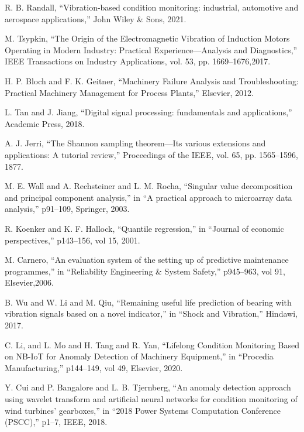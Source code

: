 \documentclass[conference]{IEEEtran}
\begin{document}
\begin{thebibliography}{00}
	 R. B. Randall, ``Vibration-based condition monitoring: industrial, automotive and aerospace applications,'' John Wiley \& Sons, 2021.

     M. Tsypkin, ``The Origin of the Electromagnetic Vibration of Induction Motors Operating in Modern Industry: Practical Experience—Analysis and Diagnostics,'' IEEE Transactions on Industry Applications, vol. 53, pp. 1669--1676,2017.

     H. P. Bloch and F. K. Geitner, ``Machinery Failure Analysis and Troubleshooting: Practical Machinery Management for Process Plants,'' Elsevier, 2012.

     L. Tan and J. Jiang, ``Digital signal processing: fundamentals and applications,'' Academic Press, 2018.

     A. J. Jerri, ``The Shannon sampling theorem—Its various extensions and applications: A tutorial review,'' Proceedings of the IEEE, vol. 65, pp. 1565--1596, 1877.

	 M. E. Wall and A. Rechsteiner and L. M. Rocha, ``Singular value decomposition and principal component analysis,'' in ``A practical approach to microarray data analysis,'' p91--109, Springer, 2003.

	 R. Koenker and K. F. Hallock, ``Quantile regression,'' in ``Journal of economic perspectives,'' p143--156, vol 15, 2001.

	 M. Carnero, ``An evaluation system of the setting up of predictive maintenance programmes,'' in ``Reliability Engineering \& System Safety,'' p945--963, vol 91, Elsevier,2006.
	
	 B. Wu and W. Li and M. Qiu, ``Remaining useful life prediction of bearing with vibration signals based on a novel indicator,'' in ``Shock and Vibration,'' Hindawi, 2017.
	
	 C. Li, and L. Mo and H. Tang and R. Yan, ``Lifelong Condition Monitoring Based on NB-IoT for Anomaly Detection of Machinery Equipment,'' in ``Procedia Manufacturing,'' p144--149, vol 49, Elsevier, 2020.
	
	 Y. Cui and P. Bangalore and L. B. Tjernberg, ``An anomaly detection approach using wavelet transform and artificial neural networks for condition monitoring of wind turbines' gearboxes,'' in ``2018 Power Systems Computation Conference (PSCC),'' p1--7, IEEE, 2018.


\end{thebibliography}
\end{document}
